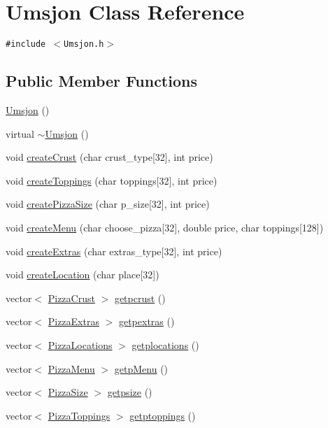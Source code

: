 \hypertarget{class_umsjon}{
\section{Umsjon Class Reference}
\label{class_umsjon}
}
{\tt \#include $<$Umsjon.h$>$}

\subsection*{Public Member Functions}
\begin{CompactItemize}
\item 
\hyperlink{class_umsjon_1f89bef332176cd139fa5f900d4735b6}{Umsjon} ()
\item 
virtual \hyperlink{class_umsjon_0e6a6c83c46b16695a818c39dd4a700a}{$\sim$Umsjon} ()
\item 
void \hyperlink{class_umsjon_75c9c243db5456ca368b8cdc6f617603}{create\-Crust} (char crust\_\-type\mbox{[}32\mbox{]}, int price)
\item 
void \hyperlink{class_umsjon_b4c5d68540dc069a5871e57482a44454}{create\-Toppings} (char toppings\mbox{[}32\mbox{]}, int price)
\item 
void \hyperlink{class_umsjon_9b94d4f7ba3bbc2c46cc7bdce8f09d61}{create\-Pizza\-Size} (char p\_\-size\mbox{[}32\mbox{]}, int price)
\item 
void \hyperlink{class_umsjon_ce183afe9e7ad9a7492ac2241e2481e5}{create\-Menu} (char choose\_\-pizza\mbox{[}32\mbox{]}, double price, char toppings\mbox{[}128\mbox{]})
\item 
void \hyperlink{class_umsjon_b3b4384d1b6159cee7aab19dc1ff23eb}{create\-Extras} (char extras\_\-type\mbox{[}32\mbox{]}, int price)
\item 
void \hyperlink{class_umsjon_6827be731c8d50370297264676be442f}{create\-Location} (char place\mbox{[}32\mbox{]})
\item 
vector$<$ \hyperlink{class_pizza_crust}{Pizza\-Crust} $>$ \hyperlink{class_umsjon_1ba4091781dbf5acfd11d9bbd3c476c1}{getpcrust} ()
\item 
vector$<$ \hyperlink{class_pizza_extras}{Pizza\-Extras} $>$ \hyperlink{class_umsjon_48a5a2fa53cb3c40c681bd053598876b}{getpextras} ()
\item 
vector$<$ \hyperlink{class_pizza_locations}{Pizza\-Locations} $>$ \hyperlink{class_umsjon_a84f9abb849190a11dfcb3f0d5d619cc}{getplocations} ()
\item 
vector$<$ \hyperlink{class_pizza_menu}{Pizza\-Menu} $>$ \hyperlink{class_umsjon_729f51349769ff866a7cf5d79d381c2b}{getp\-Menu} ()
\item 
vector$<$ \hyperlink{class_pizza_size}{Pizza\-Size} $>$ \hyperlink{class_umsjon_fffa683bcf55b44d751ab146b21b3ae9}{getpsize} ()
\item 
vector$<$ \hyperlink{class_pizza_toppings}{Pizza\-Toppings} $>$ \hyperlink{class_umsjon_63e370dface20065bb6dde6d38ea4287}{getptoppings} ()
\end{CompactItemize}
